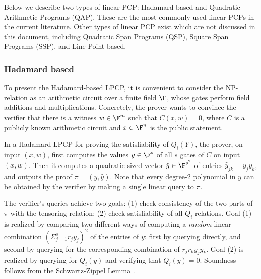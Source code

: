 Below we describe two types of linear PCP: Hadamard-based and Quadratic Arithmetic Programs (QAP).
These are the most commonly used linear PCPs in the current literature.
Other types of linear PCP exist which are not discussed in this document, including Quadratic Span Programs (QSP), Square Span Programs (SSP), and Line Point based.


\subsubsection{Hadamard based}
\label{paradigms:IT:linear-PCP:hadamard}
To present the Hadamard-based LPCP, it is convenient to consider the NP-relation as an arithmetic circuit over a finite field $\F$, whose gates perform field additions and multiplications. Concretely, the prover wants to convince the verifier that there is a witness $w\in\F^m$ such that $C(x,w)=0$, where $C$ is a publicly known arithmetic circuit and $x\in\F^n$ is the public statement. 
\loosen


In a Hadamard LPCP for proving the satisfiability of $Q_i(Y)$, the prover, on input $(x,w)$, first computes the values $y\in\F^s$ of all $s$ gates of $C$ on input $(x,w)$. 
Then it computes a quadratic sized vector $\hat{y} \in \F^{s^2}$ of entries $\hat{y}_{j k} = y_j y_k$, and outputs the proof $\pi=(y, \hat y)$.
Note that every degree-2 polynomial in $y$ can be obtained by the verifier by making a single linear query to $\pi$.

The verifier's queries achieve two goals: (1) check consistency of the two parts of $\pi$ with the tensoring relation; (2) check satisfiability of all $Q_i$ relations.  Goal (1) is realized by comparing two different ways of computing a {\em random} linear combination  $\left(\Sigma_{j=1}^s r_jy_j\right)^2$ of the entries of $y$: first by querying directly, and second by querying for the corresponding combination of $r_j r_k y_j y_k$.
Goal (2) is realized by querying for $Q_i(y)$ and verifying that $Q_i(y) = 0$. 
Soundness follows from the Schwartz-Zippel Lemma \cite{2010:Mosh}. 



